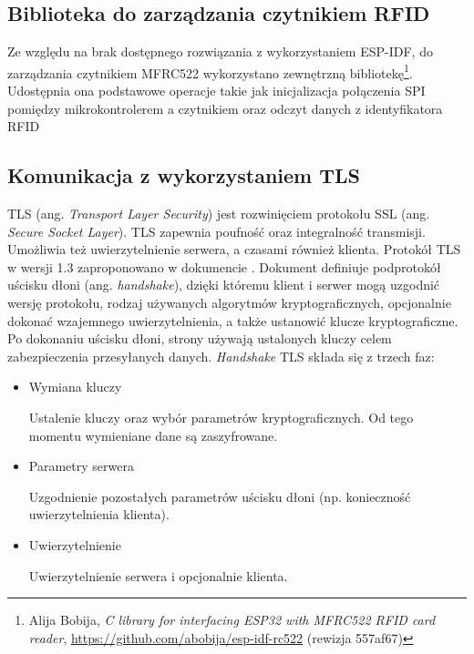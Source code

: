         \subsection{Biblioteka do zarządzania czytnikiem RFID}
        \label{sub:rfid_lib}

            Ze względu na brak dostępnego rozwiązania z wykorzystaniem ESP-IDF, do zarządzania czytnikiem MFRC522 wykorzystano zewnętrzną bibliotekę\footnote{Alija Bobija, \textit{C library for interfacing ESP32 with MFRC522 RFID card reader}, \url{https://github.com/abobija/esp-idf-rc522} (rewizja 557af67)}. Udostępnia ona podstawowe operacje takie jak inicjalizacja połączenia SPI pomiędzy mikrokontrolerem a czytnikiem oraz odczyt danych z identyfikatora RFID

        \subsection{Komunikacja z wykorzystaniem TLS}
        \label{sub:tls}

            TLS (ang. \textit{Transport Layer Security}) jest rozwinięciem protokołu SSL (ang. \textit{Secure Socket Layer}). TLS zapewnia poufność oraz integralność transmisji. Umożliwia też uwierzytelnienie serwera, a czasami również klienta.
            Protokół TLS w wersji 1.3 zaproponowano w dokumencie \cite{rfc8446}. Dokument definiuje podprotokół uścisku dłoni (ang. \textit{handshake}), dzięki któremu klient i serwer mogą uzgodnić wersję protokołu, rodzaj używanych algorytmów kryptograficznych, opcjonalnie dokonać wzajemnego uwierzytelnienia, a także ustanowić klucze kryptograficzne. Po dokonaniu uścisku dłoni, strony używają ustalonych kluczy celem zabezpieczenia przesyłanych danych.
            \textit{Handshake} TLS składa się z trzech faz:

            \begin{itemize}

                \item Wymiana kluczy

                    Ustalenie kluczy oraz wybór parametrów kryptograficznych. Od tego momentu wymieniane dane są zaszyfrowane.

                \item Parametry serwera

                    Uzgodnienie pozostałych parametrów uścisku dłoni (np. konieczność uwierzytelnienia klienta).

                \item Uwierzytelnienie

                    Uwierzytelnienie serwera i opcjonalnie klienta.
            \end{itemize}

